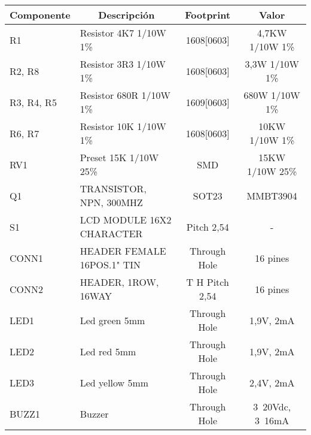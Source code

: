 \begin{table}[tbp]
\begin{center}
\begin{tabular}{|l|l|c|c|}
\hline
\multicolumn{1}{|c|}{\textbf{Componente}} & \multicolumn{1}{c|}{\textbf{Descripción}} & \textbf{ Footprint} & \textbf{Valor} \\ \hline
R1 & Resistor 4K7    1/10W     1\% & 1608[0603] & 4,7KW  1/10W   1\% \\ \hline
R2, R8 & Resistor 3R3    1/10W     1\% & 1608[0603] & 3,3W    1/10W   1\% \\ \hline
R3, R4, R5 & Resistor 680R  1/10W     1\% & 1609[0603] & 680W   1/10W   1\% \\ \hline
R6, R7 & Resistor 10K    1/10W     1\% & 1608[0603] & 10KW  1/10W   1\% \\ \hline
RV1 & Preset 15K        1/10W  25\% & SMD & 15KW   1/10W  25\% \\ \hline
Q1 & TRANSISTOR, NPN, 300MHZ & SOT23 & MMBT3904 \\ \hline
S1 & LCD MODULE 16X2 CHARACTER & Pitch 2,54 & - \\ \hline
CONN1 & HEADER FEMALE 16POS.1" TIN & Through Hole & 16 pines \\ \hline
CONN2 & HEADER, 1ROW, 16WAY & T H Pitch 2,54 & 16 pines \\ \hline
LED1 & Led green 5mm & Through Hole & 1,9V,  2mA \\ \hline
LED2 & Led red 5mm & Through Hole & 1,9V,  2mA \\ \hline
LED3 & Led yellow 5mm & Through Hole & 2,4V,  2mA \\ \hline
BUZZ1 & Buzzer & Through Hole & 3~20Vdc, 3~16mA \\ \hline
\end{tabular}
\end{center}
\caption{}
\label{}
\end{table}

  
%
  
  


